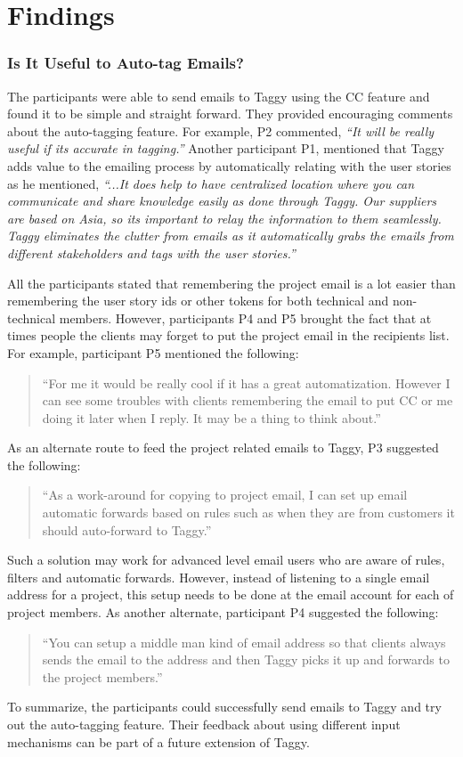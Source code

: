\section{Findings}

\subsubsection{Is It Useful to Auto-tag Emails?}
The participants were able to send emails to Taggy using the CC feature and found it to be simple and straight forward. They provided encouraging comments about the auto-tagging feature. For example, P2 commented, \emph{``It will be really useful if its accurate in tagging.''} Another participant P1, mentioned that Taggy adds value to the emailing process by automatically relating with the user stories as he mentioned, \emph{``...It does help to have centralized location where you can communicate and share knowledge easily as done through Taggy. Our suppliers are based on Asia, so its important to relay the information to them seamlessly. Taggy eliminates the clutter from emails as it automatically grabs the emails from different stakeholders and tags with the user stories.''}

All the participants stated that remembering the project email is a lot easier than remembering the user story ids or other tokens for both technical and non-technical members. However, participants P4 and P5 brought the fact that at times people the clients may forget to put the project email in the recipients list. For example, participant P5 mentioned the following:
\begin{quote}
 ``For me it would be really cool if it has a great automatization. However I can see some troubles with clients remembering the email to put CC or me doing it later when I reply. It may be a thing to think about.''
\end{quote}
As an alternate route to feed the project related emails to Taggy, P3 suggested the following:
\begin{quote}
	``As a work-around for copying to project email, I can set up email automatic forwards based on rules such as when they are from customers it should auto-forward to Taggy.'' 
\end{quote}
Such a solution may work for advanced level email users who are aware of rules, filters and automatic forwards. However, instead of listening to a single email address for a project, this setup needs to be done at the email account for each of project members. As another alternate, participant P4 suggested the following:
\begin{quote}
	``You can setup a middle man kind of email address so that clients always sends the email to the address and then Taggy picks it up and forwards to the project members.''
\end{quote}
To summarize, the participants could successfully send emails to Taggy and try out the auto-tagging feature. Their feedback about using different input mechanisms can be part of a future extension of Taggy.

